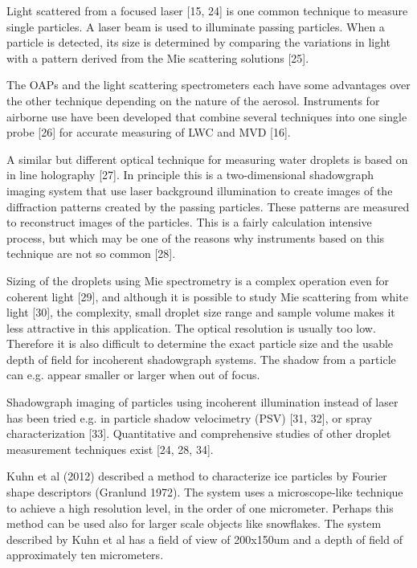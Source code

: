 Light scattered from a focused laser  [15, 24] is one common technique to measure single particles. A laser beam is used to illuminate passing particles. When a particle is detected, its size is determined by comparing the variations in light with a pattern derived from the Mie scattering solutions [25].

The OAPs and the light scattering spectrometers each have some advantages over the other technique depending on the nature of the aerosol. Instruments for airborne use have been developed that combine several techniques into one single probe [26] for accurate measuring of LWC and MVD [16].

A similar but different optical technique for measuring water droplets is based on in line holography [27]. In principle this is a two-dimensional shadowgraph imaging system that use laser background illumination to create images of the diffraction patterns created by the passing particles. These patterns are measured to reconstruct images of the particles. This is a fairly calculation intensive process, but which may be one of the reasons why instruments based on this technique are not so common [28].

Sizing of the droplets using Mie spectrometry is a complex operation even for coherent light [29], and although it is possible to study Mie scattering from white light [30], the complexity, small droplet size range and sample volume makes it less attractive in this application. The optical resolution is usually too low. Therefore it is also difficult to determine the exact particle size and the usable depth of field for incoherent shadowgraph systems. The shadow from a particle can e.g. appear smaller or larger when out of focus.

Shadowgraph imaging of particles using incoherent illumination instead of laser has been tried e.g. in particle shadow velocimetry (PSV) [31, 32], or spray characterization [33]. Quantitative and comprehensive studies of other droplet measurement techniques exist [24, 28, 34].

Kuhn et al (2012) described a method to characterize ice particles by Fourier shape descriptors (Granlund 1972). The system uses a microscope-like technique to achieve a high resolution level, in the order of one micrometer. Perhaps this method can be used also for larger scale objects like snowflakes. The system described by Kuhn et al has a field of view of 200x150um and a depth of field of approximately ten micrometers.



